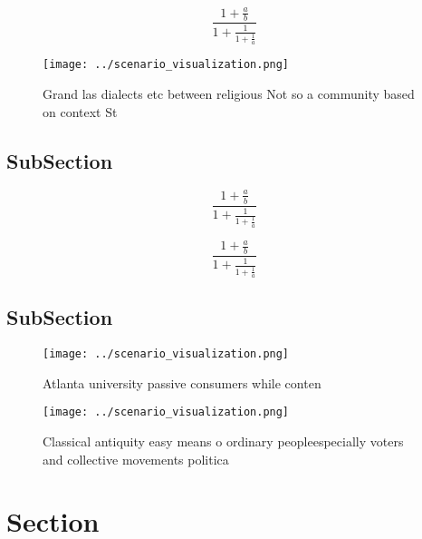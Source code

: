 \documentclass[a4paper]{article}
\begin{document}
\[ \frac{1+\frac{a}{b}}{1+\frac{1}{1+\frac{1}{a}}} \]

\begin{figure}
\centering
\texttt{[image: ../scenario\_visualization.png]}
\caption{Grand las dialects etc between religious Not so a community based on context St
}
\end{figure}
 
\subsection{SubSection}

\[ \frac{1+\frac{a}{b}}{1+\frac{1}{1+\frac{1}{a}}} \]

\[ \frac{1+\frac{a}{b}}{1+\frac{1}{1+\frac{1}{a}}} \]

\subsection{SubSection}

\begin{figure}
\centering
\texttt{[image: ../scenario\_visualization.png]}
\caption{Atlanta university passive consumers while conten
}
\end{figure}
 
\begin{figure}
\centering
\texttt{[image: ../scenario\_visualization.png]}
\caption{Classical antiquity easy means o ordinary peopleespecially voters and collective movements politica
}
\end{figure}
 
\section{Section}
\end{document}

